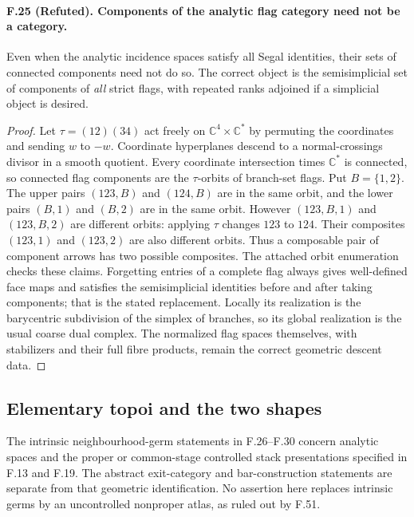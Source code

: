 \paragraph{F.25 (Refuted). Components of the analytic flag category
need not be a category.}
Even when the analytic incidence spaces satisfy all Segal identities,
their sets of connected components need not do so. The correct object
is the semisimplicial set of components of \emph{all} strict flags,
with repeated ranks adjoined if a simplicial object is desired.

\begin{proof}
Let $\tau=(12)(34)$ act freely on $\mathbb C^4\times\mathbb C^*$
by permuting the coordinates and sending $w$ to $-w$. Coordinate
hyperplanes descend to a normal-crossings divisor in a smooth
quotient. Every coordinate intersection times $\mathbb C^*$ is
connected, so connected flag components are the $\tau$-orbits of
branch-set flags. Put $B=\{1,2\}$. The upper pairs $(123,B)$ and
$(124,B)$ are in the same orbit, and the lower pairs $(B,1)$ and
$(B,2)$ are in the same orbit. However $(123,B,1)$ and $(123,B,2)$
are different orbits: applying $\tau$ changes $123$ to $124$.
Their composites $(123,1)$ and $(123,2)$ are also different orbits.
Thus a composable pair of component arrows has two possible
composites. The attached orbit enumeration checks these claims.
Forgetting entries of a complete flag always gives well-defined
face maps and satisfies the semisimplicial identities before and
after taking components; that is the stated replacement. Locally
its realization is the barycentric subdivision of the simplex of
branches, so its global realization is the usual coarse dual complex.
The normalized flag spaces themselves, with stabilizers and their
full fibre products, remain the correct geometric descent data.
\end{proof}

\subsection{Elementary topoi and the two shapes}

The intrinsic neighbourhood-germ statements in F.26--F.30 concern
analytic spaces and the proper or common-stage controlled stack
presentations specified in F.13 and F.19. The abstract exit-category
and bar-construction statements are separate from that geometric
identification. No assertion here replaces intrinsic germs by an
uncontrolled nonproper atlas, as ruled out by F.51.

